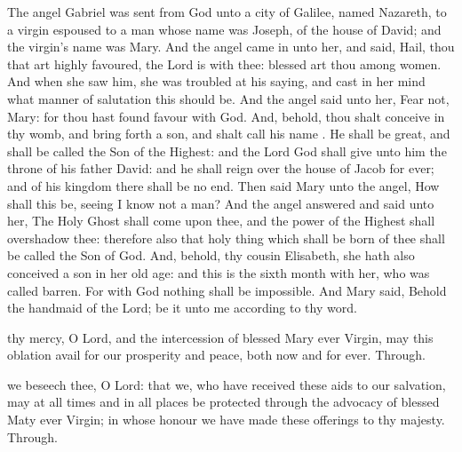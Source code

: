 
 The angel Gabriel was sent from God unto a city of Galilee, named Nazareth, to a virgin espoused to a man whose name was Joseph, of the house of David; and the virgin’s name was Mary. And the angel came in unto her, and said, Hail, thou that art highly favoured, the Lord is with thee: blessed art thou among women. And when she saw him, she was troubled at his saying, and cast in her mind what manner of salutation this should be. And the angel said unto her, Fear not, Mary: for thou hast found favour with God. And, behold, thou shalt conceive in thy womb, and bring forth a son, and shalt call his name . He shall be great, and shall be called the Son of the Highest: and the Lord God shall give unto him the throne of his father David: and he shall reign over the house of Jacob for ever; and of his kingdom there shall be no end. Then said Mary unto the angel, How shall this be, seeing I know not a man? And the angel answered and said unto her, The Holy Ghost shall come upon thee, and the power of the Highest shall overshadow thee: therefore also that holy thing which shall be born of thee shall be called the Son of God. And, behold, thy cousin Elisabeth, she hath also conceived a son in her old age: and this is the sixth month with her, who was called barren. For with God nothing shall be impossible. And Mary said, Behold the handmaid of the Lord; be it unto me according to thy word.


\secret
{} thy mercy, O Lord, and the intercession of blessed Mary ever Virgin, may this oblation avail for our prosperity and peace, both now and for ever. Through.


\postcommunion
{} we beseech thee, O Lord: that we, who have received these aids to our salvation, may at all times and in all places be protected through the advocacy of blessed Maty ever Virgin; in whose honour we have made these offerings to thy majesty. Through.



